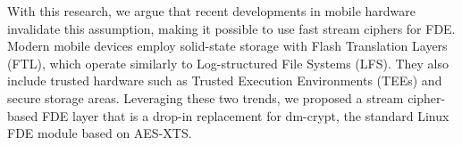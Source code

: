 With this research, we argue that recent developments in mobile hardware
invalidate this assumption, making it possible to use fast stream ciphers for
FDE. Modern mobile devices employ solid-state storage with Flash Translation
Layers (FTL), which operate similarly to Log-structured File Systems (LFS). They
also include trusted hardware such as Trusted Execution Environments (TEEs) and
secure storage areas. Leveraging these two trends, we proposed a stream
cipher-based FDE layer that is a drop-in replacement for dm-crypt, the standard
Linux FDE module based on AES-XTS.
